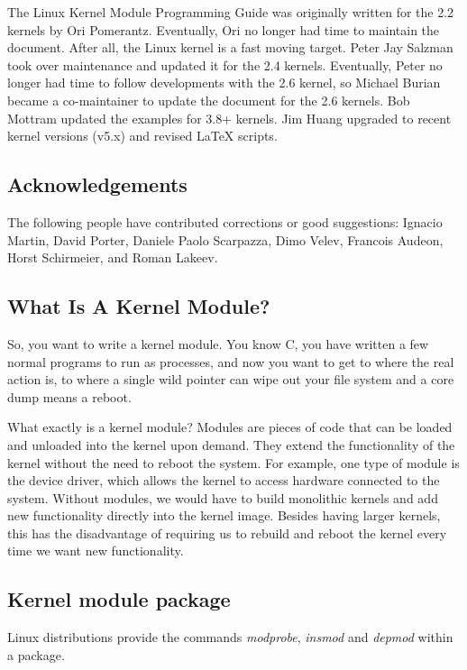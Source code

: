\documentclass[10pt, oneside]{book}
\begin{document}
The Linux Kernel Module Programming Guide was originally written for the 2.2 kernels by Ori Pomerantz.
Eventually, Ori no longer had time to maintain the document.
After all, the Linux kernel is a fast moving target.
Peter Jay Salzman took over maintenance and updated it for the 2.4 kernels.
Eventually, Peter no longer had time to follow developments with the 2.6 kernel, so Michael Burian became a co-maintainer to update the document for the 2.6 kernels.
Bob Mottram updated the examples for 3.8+ kernels.
Jim Huang upgraded to recent kernel versions (v5.x) and revised LaTeX scripts.

\subsection{Acknowledgements}
\label{sec:acknowledgements}

The following people have contributed corrections or good suggestions: Ignacio Martin, David Porter, Daniele Paolo Scarpazza, Dimo Velev, Francois Audeon, Horst Schirmeier, and Roman Lakeev.

\subsection{What Is A Kernel Module?}
\label{sec:kernelmod}

So, you want to write a kernel module.
You know C, you have written a few normal programs to run as processes, and now you want to get to where the real action is, to where a single wild pointer can wipe out your file system and a core dump means a reboot.

What exactly is a kernel module?
Modules are pieces of code that can be loaded and unloaded into the kernel upon demand.
They extend the functionality of the kernel without the need to reboot the system.
For example, one type of module is the device driver, which allows the kernel to access hardware connected to the system.
Without modules, we would have to build monolithic kernels and add new functionality directly into the kernel image.
Besides having larger kernels, this has the disadvantage of requiring us to rebuild and reboot the kernel every time we want new functionality.

\subsection{Kernel module package}
\label{sec:packages}

Linux distributions provide the commands \emph{modprobe}, \emph{insmod} and \emph{depmod} within a package.
\end{document}
